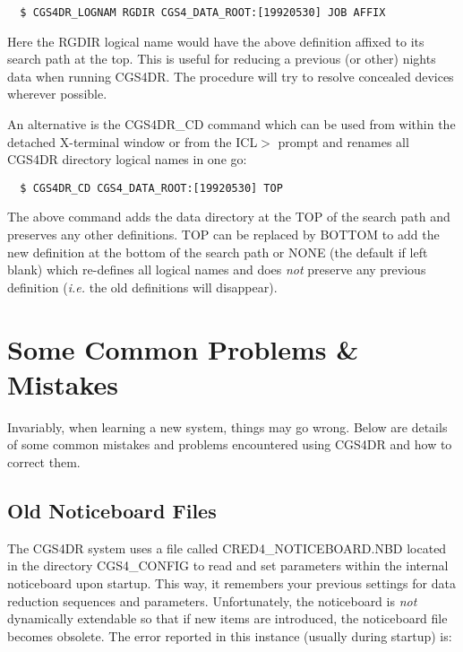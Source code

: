{\begin{verbatim}
  $ CGS4DR_LOGNAM RGDIR CGS4_DATA_ROOT:[19920530] JOB AFFIX
\end{verbatim}

Here the {\sf RGDIR} logical name would have the above definition
affixed to its search path at the top. This is useful for reducing
a previous (or other) nights data when running CGS4DR. The procedure
will try to resolve concealed devices wherever possible.

An alternative is the CGS4DR\_CD command which can be used from within 
the detached X-terminal window or from the {\sf ICL$>$} prompt and renames 
all CGS4DR directory logical names in one go:

\begin{verbatim}
  $ CGS4DR_CD CGS4_DATA_ROOT:[19920530] TOP
\end{verbatim}

The above command adds the data directory at the {\sf TOP} of the search path
and preserves any other definitions. {\sf TOP} can be replaced by {\sf BOTTOM}
to add the new definition at the bottom of the search path or {\sf NONE} 
(the default if left blank) which re-defines all logical names and does
{\em not} preserve any previous definition ({\em i.e.} the old definitions
will disappear).

\newpage
\markright{\stardocname}
\section{Some Common Problems \& Mistakes}
\label{common_problems_and_mistakes}

Invariably, when learning a new system, things may  go wrong. Below are 
details of some common mistakes and problems encountered using CGS4DR and
how to correct them.

\subsection{Old Noticeboard Files}
\label{old_noticeboard_files}

The CGS4DR system uses a file called CRED4\_NOTICEBOARD.NBD located in the 
directory CGS4\_CONFIG to read and set parameters within the internal 
noticeboard upon startup. This way, it remembers your previous settings for 
data reduction sequences and parameters. Unfortunately, the noticeboard is 
{\em not} dynamically extendable so that if new items are introduced, the 
noticeboard file becomes obsolete. The error reported in this instance 
(usually during startup) is:

}
